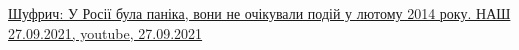  
 
 
 
 


\href{https://www.youtube.com/watch?v=B8c6haF3jhU}{%
Шуфрич: У Росії була паніка, вони не очікували подій у лютому 2014 року. НАШ 27.09.2021, %
youtube, 27.09.2021%
}
